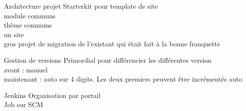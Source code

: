 \begin{frame}{Architecture projet}
	Starterkit pour template de site
	\\
	module communs
	\\
	thème communs
	\\
	un site 
	\\ gros projet de migration de l'existant qui était fait à la bonne franquette
\end{frame}

\begin{frame}{Gestion de versions}
	Primordial pour différencier les différentes version \\
	avant : manuel \\
	maintenant : auto sur 4 digits. Les deux premiers peuvent être incrémentés auto
\end{frame}

\begin{frame}{Jenkins}
	Organisation par portail \\ 
	Job sur SCM \\
	
\end{frame}